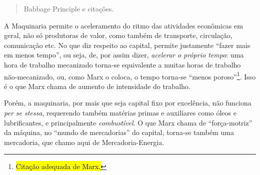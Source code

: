 \begin{quote}
Babbage Principle e citações.
\end{quote}


A Maquinaria permite o aceleramento do ritmo das atividades econômicas em geral, não só produtoras de valor, como também de transporte, circulação, comunicação etc. No que diz respeito ao capital, permite justamente ``fazer mais em menos tempo'', ou seja, de, por assim dizer, \textit{acelerar o próprio tempo}: uma hora de trabalho mecanizado torna-se equivalente a muitas horas de trabalho não-mecanizado, ou, como Marx o coloca, o tempo torna-se ``menos poroso''\footnote{\hl{Citação adequada de Marx.}}. Isso é o que Marx chama de aumento de intensidade do trabalho. 

Porém, a maquinaria, por mais que seja capital fixo por excelência, não funciona \textit{per se stessa}, requerendo também matérias primas e auxiliares como óleos e lubrificantes, e principalmente \textit{combustível}. O que Marx chama de ``força-motriz'' da máquina, no ``mundo de mercadorias'' do capital, torna-se também uma mercadoria, que chamo aqui de Mercadoria-Energia. 

